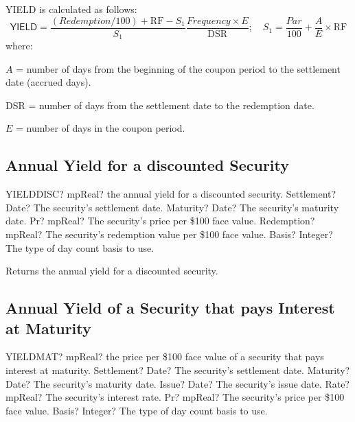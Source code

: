 \vspace{0.3cm}
YIELD is calculated as follows: 
\begin{equation}
\textsf{YIELD} = \frac{(Redemption/100) + \text{RF} - S_1}{S_1}  \frac{Frequency \times E}{\text{DSR}}; \quad S_1 = \frac{Par}{100}+ \frac{A}{E} \times \text{RF}
\end{equation}
where:

$A$ = number of days from the beginning of the coupon period to the settlement date (accrued days).

DSR = number of days from the settlement date to the redemption date.

$E$ = number of days in the coupon period.



\subsection{Annual Yield for a discounted Security}


\begin{mpFunctionsExtract}
	\mpWorksheetFunctionFiveNotImplemented
	{YIELDDISC? mpReal? the annual yield for a discounted security.}
	{Settlement? Date?  The security's settlement date.}
	{Maturity? Date? The security's maturity date.}
	{Pr? mpReal? The security's price per \$100 face value.}
	{Redemption? mpReal? The security's redemption value per \$100 face value.}
	{Basis? Integer? The type of day count basis to use.}
\end{mpFunctionsExtract}

\vspace{0.3cm}
Returns the annual yield for a discounted security.



\subsection{Annual Yield of a Security that pays Interest at Maturity}


\begin{mpFunctionsExtract}
	\mpWorksheetFunctionSixNotImplemented
	{YIELDMAT? mpReal? the price per \$100 face value  of a security that pays interest at maturity.}
	{Settlement? Date?  The security's settlement date.}
	{Maturity? Date? The security's maturity date.}
	{Issue? Date? The security's issue date.}
	{Rate? mpReal? The security's interest rate.}
	{Pr? mpReal? The security's price per \$100 face value.}
	{Basis? Integer? The type of day count basis to use.}
\end{mpFunctionsExtract}

